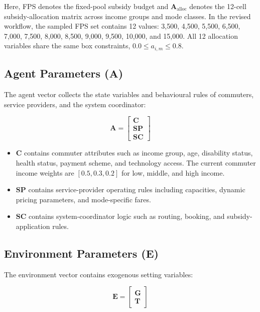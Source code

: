 Here, FPS denotes the fixed-pool subsidy budget and $\mathbf{A}_{\text{alloc}}$ denotes the 12-cell subsidy-allocation matrix across income groups and mode classes. In the revised workflow, the sampled FPS set contains 12 values: 3,500, 4,500, 5,500, 6,500, 7,000, 7,500, 8,000, 8,500, 9,000, 9,500, 10,000, and 15,000. All 12 allocation variables share the same box constraints, $0.0 \leq a_{i,m} \leq 0.8$.

\subsection{Agent Parameters \texorpdfstring{($\mathbf{A}$)}{(A)}}
The agent vector collects the state variables and behavioural rules of commuters, service providers, and the system coordinator:

\begin{equation}
\mathbf{A} = \begin{bmatrix} \mathbf{C} \\ \mathbf{SP} \\ \mathbf{SC} \end{bmatrix}
\end{equation}

\begin{itemize}
    \item $\mathbf{C}$ contains commuter attributes such as income group, age, disability status, health status, payment scheme, and technology access. The current commuter income weights are $[0.5, 0.3, 0.2]$ for low, middle, and high income.
    \item $\mathbf{SP}$ contains service-provider operating rules including capacities, dynamic pricing parameters, and mode-specific fares.
    \item $\mathbf{SC}$ contains system-coordinator logic such as routing, booking, and subsidy-application rules.
\end{itemize}

\subsection{Environment Parameters \texorpdfstring{($\mathbf{E}$)}{(E)}}
The environment vector contains exogenous setting variables:

\begin{equation}
\mathbf{E} = \begin{bmatrix} \mathbf{G} \\ \mathbf{T} \end{bmatrix}
\end{equation}

